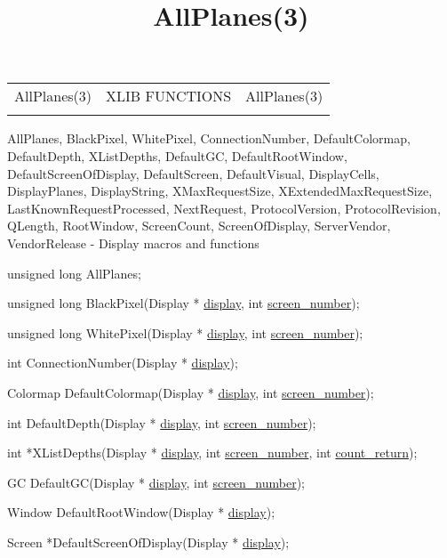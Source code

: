 \documentclass[]{article}
\title{AllPlanes(3)}
\author{}
\date{}
\renewcommand{\emph}[1]{\underline{#1}}
\begin{document}
\maketitle

\begin{longtable}[c]{@{}lll@{}}
\toprule\addlinespace
AllPlanes(3) & XLIB FUNCTIONS & AllPlanes(3)
\\\addlinespace
\bottomrule
\end{longtable}


AllPlanes, BlackPixel, WhitePixel, ConnectionNumber, DefaultColormap,
DefaultDepth, XListDepths, DefaultGC, DefaultRootWindow,
DefaultScreenOfDisplay, DefaultScreen, DefaultVisual, DisplayCells,
DisplayPlanes, DisplayString, XMaxRequestSize, XExtendedMaxRequestSize,
LastKnownRequestProcessed, NextRequest, ProtocolVersion,
ProtocolRevision, QLength, RootWindow, ScreenCount, ScreenOfDisplay,
ServerVendor, VendorRelease - Display macros and functions


unsigned long AllPlanes;

unsigned long BlackPixel(Display * \emph{display}, int
\emph{screen\_number});

unsigned long WhitePixel(Display * \emph{display}, int
\emph{screen\_number});

int ConnectionNumber(Display * \emph{display});

Colormap DefaultColormap(Display * \emph{display}, int
\emph{screen\_number});

int DefaultDepth(Display * \emph{display}, int \emph{screen\_number});

int *XListDepths(Display * \emph{display}, int \emph{screen\_number},
int \emph{count\_return});

GC DefaultGC(Display * \emph{display}, int \emph{screen\_number});

Window DefaultRootWindow(Display * \emph{display});

Screen *DefaultScreenOfDisplay(Display * \emph{display});
\end{document}
